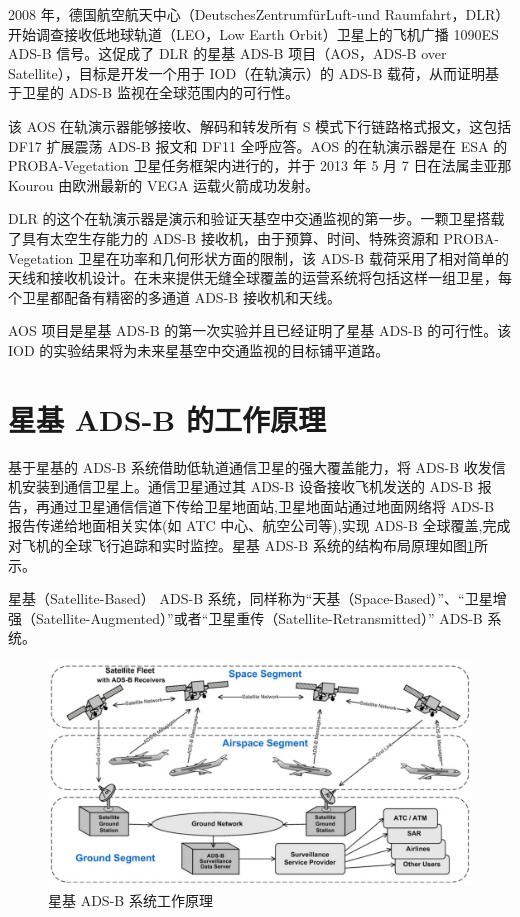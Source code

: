 2008 年，德国航空航天中心（DeutschesZentrumfürLuft-und Raumfahrt，DLR）开始调查接收低地球轨道（LEO，Low Earth Orbit）卫星上的飞机广播 1090ES ADS-B 信号。这促成了 DLR 的星基 ADS-B 项目（AOS，ADS-B over Satellite），目标是开发一个用于 IOD（在轨演示）的 ADS-B 载荷，从而证明基于卫星的 ADS-B 监视在全球范围内的可行性。

该 AOS 在轨演示器能够接收、解码和转发所有 S 模式下行链路格式报文，这包括 DF17 扩展震荡 ADS-B 报文和 DF11 全呼应答。AOS 的在轨演示器是在 ESA 的 PROBA-Vegetation 卫星任务框架内进行的，并于 2013 年 5 月 7 日在法属圭亚那 Kourou 由欧洲最新的 VEGA 运载火箭成功发射。

DLR 的这个在轨演示器是演示和验证天基空中交通监视的第一步。一颗卫星搭载了具有太空生存能力的 ADS-B 接收机，由于预算、时间、特殊资源和 PROBA-Vegetation 卫星在功率和几何形状方面的限制，该 ADS-B 载荷采用了相对简单的天线和接收机设计。在未来提供无缝全球覆盖的运营系统将包括这样一组卫星，每个卫星都配备有精密的多通道 ADS-B 接收机和天线。

AOS 项目是星基 ADS-B 的第一次实验并且已经证明了星基 ADS-B 的可行性。该 IOD 的实验结果将为未来星基空中交通监视的目标铺平道路。

\section{星基 ADS-B 的工作原理}

基于星基的 ADS-B 系统借助低轨道通信卫星的强大覆盖能力，将 ADS-B 收发信机安装到通信卫星上。通信卫星通过其 ADS-B 设备接收飞机发送的 ADS-B 报告，再通过卫星通信信道下传给卫星地面站,卫星地面站通过地面网络将 ADS-B 报告传递给地面相关实体(如 ATC 中心、航空公司等),实现 ADS-B 全球覆盖,完成对飞机的全球飞行追踪和实时监控。星基 ADS-B 系统的结构布局原理如图\ref{fig:satellite_ads-b_arichitecture}所示。

星基（Satellite-Based） ADS-B 系统，同样称为“天基（Space-Based）”、“卫星增强（Satellite-Augmented）”或者“卫星重传（Satellite-Retransmitted）” ADS-B 系统。

\begin{figure}[!htb]
\centering
\includegraphics[width=15cm]{pic/satellite_ads-b_arichitecture.png}
\caption{星基 ADS-B 系统工作原理}
\label{fig:satellite_ads-b_arichitecture}
\end{figure}
